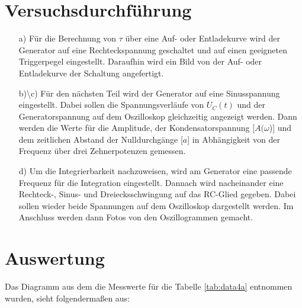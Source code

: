 \section{Versuchsdurchführung}
\begin{enumerate}
\item[a)] Für die Berechnung von $\tau$ über eine Auf- oder Entladekurve wird der 
          Generator auf eine Rechteckspannung geschaltet und auf einen geeigneten 
          Triggerpegel eingestellt. Daraufhin wird ein Bild von der Auf- 
          oder Entladekurve der Schaltung angefertigt.\\
\item[b)\textbackslash c)] Für den nächsten Teil wird der Generator auf eine Sinusspannung 
          eingestellt. Dabei sollen die Spannungsverläufe von $U_C(t)$ und der 
          Generatorspannung auf dem Oszilloskop gleichzeitig angezeigt werden. 
          Dann werden die Werte für die Amplitude, der Kondensatorspannung 
          [$A(\omega$)] und dem zeitlichen Abstand der Nulldurchgänge 
          [$a$] in Abhängigkeit von der Frequenz über drei Zehnerpotenzen gemessen.\\
\item[d)] Um die Integrierbarkeit nachzuweisen, wird am Generator eine passende 
          Frequenz für die Integration eingestellt. Dannach wird nacheinander eine 
          Rechteck-, Sinus- und Dreiecksschwingung auf das RC-Glied gegeben. 
          Dabei sollen wieder beide Spannungen auf dem Oszilloskop dargestellt 
          werden. Im Anschluss werden dann Fotos von den Oszillogrammen gemacht.
\end{enumerate}

\section{Auswertung}

  
  Das Diagramm aus dem die Messwerte für die Tabelle \ref{tab:data4a} entnommen 
  wurden, sieht folgendermaßen aus:

